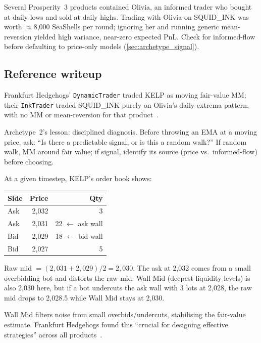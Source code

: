 \begin{pitfallbox}
Several Prosperity~3 products contained Olivia, an informed trader
who bought at daily lows and sold at daily highs.  Trading with
Olivia on SQUID\_INK was worth $\approx$8{,}000 SeaShells per round;
ignoring her and running generic mean-reversion yielded high
variance, near-zero expected PnL.  Check for informed-flow before
defaulting to price-only models
(\cref{sec:archetype_signal}).
\end{pitfallbox}

\subsection{Reference writeup}

Frankfurt Hedgehogs' \texttt{DynamicTrader} traded KELP as moving
fair-value MM; their \texttt{InkTrader} traded SQUID\_INK purely on
Olivia's daily-extrema pattern, with no MM or mean-reversion for that
product~\citep{frankfurthedgehogs2025}.

\begin{intuitionbox}
Archetype~2's lesson: disciplined diagnosis.  Before throwing an EMA
at a moving price, ask: ``Is there a predictable signal, or is this a
random walk?''  If random walk, MM around fair value; if signal,
identify its source (price vs.\ informed-flow) before choosing.
\end{intuitionbox}

\begin{prosperitybox}[title={KELP: Wall Mid vs.\ raw mid}]
At a given timestep, KELP's order book shows:

\medskip
\begin{tabular}{lrr}
\toprule
\textbf{Side} & \textbf{Price} & \textbf{Qty} \\
\midrule
Ask & 2{,}032 & 3 \\
Ask & 2{,}031 & 22 \quad$\leftarrow$ ask wall \\
Bid & 2{,}029 & 18 \quad$\leftarrow$ bid wall \\
Bid & 2{,}027 & 5 \\
\bottomrule
\end{tabular}
\medskip

Raw mid $= (2{,}031 + 2{,}029)/2 = 2{,}030$.  The ask at 2{,}032
comes from a small overbidding bot and distorts the raw mid.  Wall
Mid (deepest-liquidity levels) is also 2{,}030 here, but if a bot
undercuts the ask wall with 3 lots at 2{,}028, the raw mid drops to
2{,}028.5 while Wall Mid stays at 2{,}030.

Wall Mid filters noise from small overbids/undercuts, stabilising the
fair-value estimate.  Frankfurt Hedgehogs found this ``crucial for
designing effective strategies'' across all
products~\citep{frankfurthedgehogs2025}.
\end{prosperitybox}

